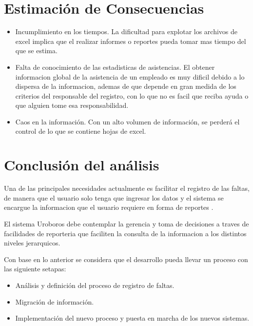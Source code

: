 \documentclass[10pt]{book}
\newcommand{\nombreProyecto}{Uroboros }
\begin{document}
\section{Estimación de Consecuencias}

\begin{itemize}	
	\item Incumplimiento en los tiempos. La dificultad para explotar los archivos de excel implica que el realizar informes o reportes pueda tomar mas tiempo del que se estima.
	\item Falta de conocimiento de las estadisticas de asistencias. El obtener informacion global de la asistencia de un empleado es muy dificil debido a lo dispersa de la informacion, ademas de que depende en gran medida de los criterios del responsable del registro, con lo que no es facil que reciba ayuda o que alguien tome esa responsabilidad.
	\item Caos en la información. Con un alto volumen de información, se perderá el control de lo que se contiene hojas de excel.
\end{itemize}


\section{Conclusión del análisis}
	
	Una de las principales necesidades actualmente es facilitar el registro de las faltas, de manera que el usuario solo tenga que ingresar los datos y el sistema se encargue la informacion que el usuario requiere en forma de reportes .
	
	El sistema \nombreProyecto debe contemplar la gerencia y toma de decisiones a traves de facilidades de reporteria que faciliten la consulta de la informacion a los distintos niveles jerarquicos.
	
	Con base en lo anterior se considera que el desarrollo pueda llevar un proceso con las siguiente setapas:
	
\begin{itemize}
	\item Análisis y definición del proceso de registro de faltas.
	\item Migración de información.
	\item Implementación del nuevo proceso y puesta en marcha de los nuevos sistemas.
\end{itemize}
\end{document}
